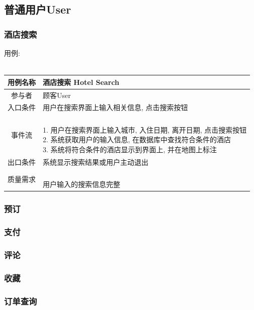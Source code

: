 \documentclass[11pt]{article}
\begin{document}
		
	
	\subsection{普通用户User}
	
		\subsubsection{酒店搜索}
			用例: \\ \\
			\begin{tabular}{c|l}
			\hline
			用例名称 & 酒店搜索 Hotel Search \\ \hline
			参与者 & 顾客User  \\ \hline
			入口条件 & 用户在搜索界面上输入相关信息, 点击搜索按钮 \\ \hline
			事件流 & 	\parbox{33em}{\ \\
						1. 用户在搜索界面上输入城市, 入住日期,  离开日期, 点击搜索按钮 \\
						2. 系统获取用户的输入信息, 在数据库中查找符合条件的酒店 \\
						3. 系统将符合条件的酒店显示到界面上, 并在地图上标注  \\
						} \\ \hline
			出口条件 & 系统显示搜索结果或用户主动退出 \\ \hline
			质量需求 & \parbox{33em}{\ \\
						用户输入的搜索信息完整 \\
						} \\ \hline
			\end{tabular}

		\subsubsection{预订}
		\subsubsection{支付}
		\subsubsection{评论}
		\subsubsection{收藏}
		\subsubsection{订单查询}
\end{document}
